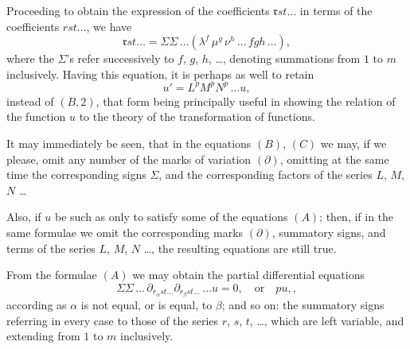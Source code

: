 \documentclass[11pt,a4paper]{article}
\theoremstyle{plain}
\theoremstyle{definition}
\theoremstyle{remark}
\begin{document}
Proceeding to obtain the expression of the coefficients $\mathfrak{r}st\ldots$ in terms of the
coefficients $rst\ldots$, we have
\[
\mathfrak{r}st\ldots = \Sigma\Sigma\,\ldots(\lambda^f\,\mu^g\,\nu^h\,\ldots\,fgh\,\ldots)
\tag{C},
\]
where the $\Sigma$'s refer successively to $f$, $g$, $h$, \ldots, denoting summations from $1$ to $m$
inclusively. Having this equation, it is perhaps as well to retain
\[
u' = L^p M^p N^p\,\ldots u
\tag{B, 1},
\]
instead of $(B, 2)$, that form being principally useful in showing the relation of the
function $u$ to the theory of the transformation of functions.

It may immediately be seen, that in the equations $(B)$, $(C)$ we may, if we please,
omit any number of the marks of variation $(\partial)$, omitting at the same time the
corresponding signs $\Sigma$, and the corresponding factors of the series $L$, $M$, $N$ \ldots

Also, if $u$ be such as only to satisfy some of the equations $(A)$; then, if in the
same formulae we omit the corresponding marks $(\partial)$, summatory signs, and terms of the
series $L$, $M$, $N$ \ldots, the resulting equations are still true.

\newpage

From the formulae $(A)$ we may obtain the partial differential equations
\[
\Sigma\Sigma\,\ldots\,\partial_{r_\alpha st\ldots}\partial_{r_\beta st\ldots}\,\ldots u = 0,\quad\text{or}\quad pu,
\tag{D},
\]
according as $\alpha$ is not equal, or is equal, to $\beta$;
and so on: the summatory signs referring in every case to those of the series $r$, $s$, $t$, \ldots,
which are left variable, and extending from $1$ to $m$ inclusively.
\end{document}
